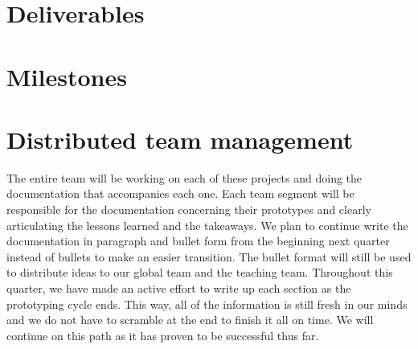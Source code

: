 \section{Deliverables}

\section{Milestones}

\section{Distributed team management}
The entire team will be working on each of these projects and doing the documentation that accompanies each one.  Each team segment will be responsible for the documentation concerning their prototypes and clearly articulating the lessons learned and the takeaways. We plan to continue write the documentation in paragraph and bullet form from the beginning next quarter instead of bullets to make an easier transition.  The bullet format will still be used to distribute ideas to our global team and the teaching team. Throughout this quarter, we have made an active effort to write up each section as the prototyping cycle ends. This way, all of the information is still fresh in our minds and we do not have to scramble at the end to finish it all on time. We will continue on this path as it has proven to be successful thus far. 



